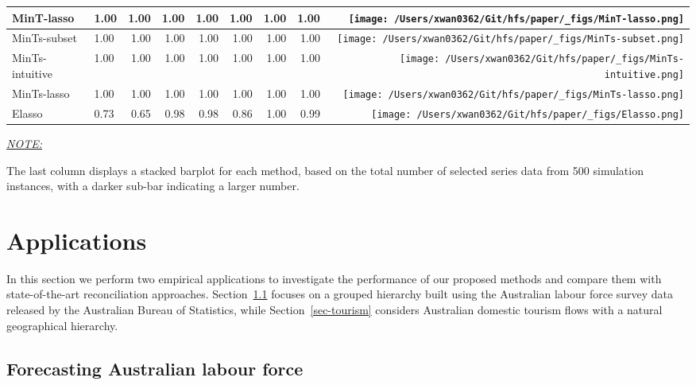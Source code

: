\documentclass[11pt,a4paper,]{article}
\begin{document}
\begin{table}[!h]
{\begin{threeparttable}
\begin{tabular}{llrrrrrr>{}r}
MinT-lasso & 1.00 & 1.00 & 1.00 & 1.00 & 1.00 & 1.00 & 1.00 & \texttt{[image: /Users/xwan0362/Git/hfs/paper/\_figs/MinT-lasso.png]}\\
\midrule
MinTs-subset & 1.00 & 1.00 & 1.00 & 1.00 & 1.00 & 1.00 & 1.00 & \texttt{[image: /Users/xwan0362/Git/hfs/paper/\_figs/MinTs-subset.png]}\\
MinTs-intuitive & 1.00 & 1.00 & 1.00 & 1.00 & 1.00 & 1.00 & 1.00 & \texttt{[image: /Users/xwan0362/Git/hfs/paper/\_figs/MinTs-intuitive.png]}\\
MinTs-lasso & 1.00 & 1.00 & 1.00 & 1.00 & 1.00 & 1.00 & 1.00 & \texttt{[image: /Users/xwan0362/Git/hfs/paper/\_figs/MinTs-lasso.png]}\\
\midrule
Elasso & 0.73 & 0.65 & 0.98 & 0.98 & 0.86 & 1.00 & 0.99 & \texttt{[image: /Users/xwan0362/Git/hfs/paper/\_figs/Elasso.png]}\\
\bottomrule
\end{tabular}
\begin{tablenotes}[para]
\item \underline{\textit{NOTE:}} 
\item The last column displays a stacked barplot for each method, based on the total number of selected series data from 500 simulation instances, with a darker sub-bar indicating a larger number.
\end{tablenotes}
\end{threeparttable}}
\endgroup{}
\end{table}

\hypertarget{sec-applications}{%
\section{Applications}\label{sec-applications}}

In this section we perform two empirical applications to investigate the
performance of our proposed methods and compare them with
state-of-the-art reconciliation approaches. Section~\ref{sec-labour}
focuses on a grouped hierarchy built using the Australian labour force
survey data released by the Australian Bureau of Statistics, while
Section~\ref{sec-tourism} considers Australian domestic tourism flows
with a natural geographical hierarchy.

\hypertarget{sec-labour}{%
\subsection{Forecasting Australian labour force}\label{sec-labour}}
\end{document}
